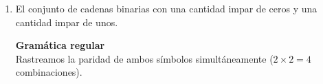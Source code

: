 \documentclass[12pt]{article}
\newcommand{\Aspace}{0.2cm}
\begin{document}
\begin{enumerate}
{            Definimos $G = (V, T, P, S)$ con $V = \{ S, A \}$, $T = \{ a \}$. \\
            Producciones $P$: \\
            \begin{tabular}{ccc}
                $S$ & $\rightarrow$ & $aA$ \\
                $A$ & $\rightarrow$ & $aS$ \\
                & | & $\varepsilon$
            \end{tabular} \\

            $S$ = cantidad par de $a$ le\'idas (inicio, 0 es par). \\
            $A$ = cantidad impar de $a$ le\'idas (puede derivar $\varepsilon$). \\ 

            \textbf{Verificación:} \\
            $S \Rightarrow aA \Rightarrow a$ \quad (acepta $a$, $m = 0$) \\
            $S \Rightarrow aA \Rightarrow aaS \Rightarrow aaaA \Rightarrow aaa$ \quad (acepta $aaa$, $m = 1$) \\
            $S \Rightarrow aA \Rightarrow aaS$ \quad ($S$ no deriva $\varepsilon$, rechaza $aa$)
        }


    \item El conjunto de cadenas binarias con una cantidad impar de ceros y una cantidad impar de unos.
        \vspace{\Aspace} \par
        { \color{azul}
            \textbf{Gramática regular} \\
            Rastreamos la paridad de ambos símbolos simultáneamente ($2 \times 2 = 4$ combinaciones).

}
\end{enumerate}
\end{document}
